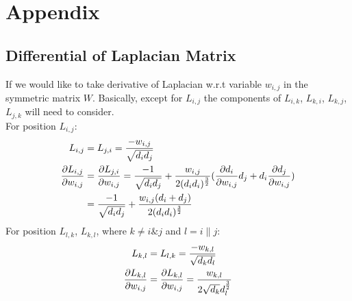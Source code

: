 \documentclass[final]{siamltexmm}
\begin{document}
\section{Appendix}
\subsection{Differential of Laplacian Matrix}
If we would like to take derivative of Laplacian w.r.t variable $w_{i,j}$ in the symmetric matrix $W$. Basically, except for $L_{i,j}$ the components of $L_{i,k}$, $L_{k,i}$, $L_{k,j}$, $L_{j,k}$ will need to consider.\\
For position $L_{i,j}$:
\begin{equation}
\begin{aligned}
L_{i,j} &= L_{j,i} =  {-w_{i,j} \over \sqrt{d_id_j}} \\
{\partial L_{i,j} \over \partial w_{i,j}} &= {\partial L_{j,i} \over \partial w_{i,j}} = {-1 \over \sqrt{d_id_j}} + {w_{i,j} \over 2(d_id_i)^{3\over 2}}({\partial d_i \over \partial w_{i,j}}d_j + d_i{\partial d_j \over \partial w_{i,j}}) \\
&= {-1 \over \sqrt{d_id_j}} + {w_{i,j}(d_i+d_j) \over 2(d_id_i)^{3\over 2}}
\end{aligned}
\end{equation}
For position $L_{l,k}$, $L_{k,l}$, where $k \neq i \& j$ and $l = i\|j$:
\begin{equation}
\begin{aligned}
L_{k,l} &= L_{l,k} =  {-w_{k,l} \over \sqrt{d_kd_l}} \\
{\partial L_{k,l} \over \partial w_{i,j}} &= {\partial L_{k,l} \over \partial w_{i,j}} = {w_{k,l} \over 2\sqrt{d_k}d_l^{3\over2}}
\end{aligned}
\end{equation}
\end{document}
